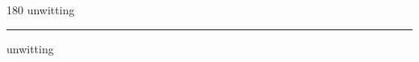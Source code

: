 
\begin{frame}
\begin{center}
\begin{turn}{180}
{\fontsize{2.5cm}{1em}\selectfont unwitting}
\end{turn}
\vspace{1em}\par  
\hrule
\vspace{1em}\par  
{\fontsize{2.5cm}{1em}\selectfont unwitting}
\end{center}
\end{frame}
